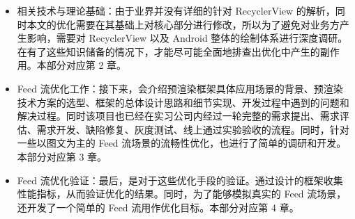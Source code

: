 \begin{itemize}

    \item 相关技术与理论基础：由于业界并没有详细的针对 RecyclerView 的解析，同时本文的优化需要在其基础上对核心部分进行修改，所以为了避免对业务方产生影响，需要对 RecyclerView 以及 Android 整体的绘制体系进行深度调研。在有了这些知识储备的情况下，才能尽可能全面地排查出优化中产生的副作用。本部分对应第 2 章。

    \item Feed 流优化工作：接下来，会介绍预渲染框架具体应用场景的背景、预渲染技术方案的选型、框架的总体设计思路和细节实现、开发过程中遇到的问题和解决过程。同时该项目也已经在实习公司内经过一轮完整的需求提出、需求评估、需求开发、缺陷修复、灰度测试、线上通过实验验收的流程。同时，针对一些以图文为主的 Feed 流场景的流畅性优化，也进行了简单的调研和开发。本部分对应第 3 章。

    \item Feed 流优化验证：最后，是对于这些优化手段的验证。通过设计的框架收集性能指标，从而验证优化的结果。同时，为了能够模拟真实的 Feed 流场景，还开发了一个简单的 Feed 流用作优化目标。本部分对应第 4 章。

\end{itemize}
